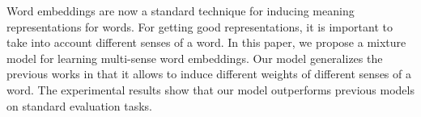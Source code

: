 Word embeddings are now a standard technique for inducing meaning representations for words. For getting good representations, it is important to take into account different senses of a word. In this paper, we propose a mixture model for learning multi-sense word embeddings. Our model generalizes the previous works in that it allows to induce different weights of different senses of a word. The experimental results show that our model outperforms previous models on standard evaluation tasks.
